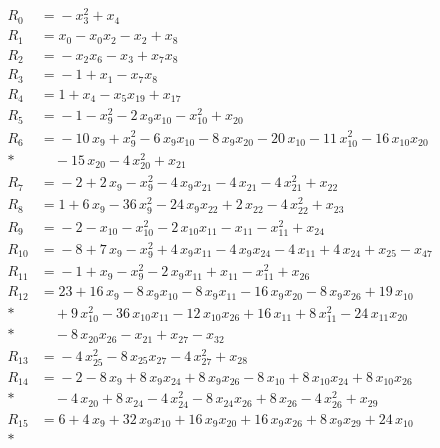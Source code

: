 \begingroup
\small
\setlength{\jot}{0pt}
\begin{align*}
R_{0} &={} -x_{3}^{2} +x_{4} \\[2pt]
R_{1} &={} x_{0} -x_{0} x_{2} -x_{2} +x_{8} \\[2pt]
R_{2} &={} -x_{2} x_{6} -x_{3} +x_{7} x_{8} \\[2pt]
R_{3} &={} -1 +x_{1} -x_{7} x_{8} \\[2pt]
R_{4} &={} 1 +x_{4} -x_{5} x_{19} +x_{17} \\[2pt]
R_{5} &={} -1 -x_{9}^{2} -2\,x_{9} x_{10} -x_{10}^{2} +x_{20} \\[2pt]
R_{6} &={} -10\,x_{9} +x_{9}^{2} -6\,x_{9} x_{10} -8\,x_{9} x_{20} -20\,x_{10} -11\,x_{10}^{2} -16\,x_{10} x_{20} \\*
&\quad{} -15\,x_{20} -4\,x_{20}^{2} +x_{21} \\[2pt]
R_{7} &={} -2 +2\,x_{9} -x_{9}^{2} -4\,x_{9} x_{21} -4\,x_{21} -4\,x_{21}^{2} +x_{22} \\[2pt]
R_{8} &={} 1 +6\,x_{9} -36\,x_{9}^{2} -24\,x_{9} x_{22} +2\,x_{22} -4\,x_{22}^{2} +x_{23} \\[2pt]
R_{9} &={} -2 -x_{10} -x_{10}^{2} -2\,x_{10} x_{11} -x_{11} -x_{11}^{2} +x_{24} \\[2pt]
R_{10} &={} -8 +7\,x_{9} -x_{9}^{2} +4\,x_{9} x_{11} -4\,x_{9} x_{24} -4\,x_{11} +4\,x_{24} +x_{25} -x_{47} \\[2pt]
R_{11} &={} -1 +x_{9} -x_{9}^{2} -2\,x_{9} x_{11} +x_{11} -x_{11}^{2} +x_{26} \\[2pt]
R_{12} &={} 23 +16\,x_{9} -8\,x_{9} x_{10} -8\,x_{9} x_{11} -16\,x_{9} x_{20} -8\,x_{9} x_{26} +19\,x_{10} \\*
&\quad{} +9\,x_{10}^{2} -36\,x_{10} x_{11} -12\,x_{10} x_{26} +16\,x_{11} +8\,x_{11}^{2} -24\,x_{11} x_{20} \\*
&\quad{} -8\,x_{20} x_{26} -x_{21} +x_{27} -x_{32} \\[2pt]
R_{13} &={} -4\,x_{25}^{2} -8\,x_{25} x_{27} -4\,x_{27}^{2} +x_{28} \\[2pt]
R_{14} &={} -2 -8\,x_{9} +8\,x_{9} x_{24} +8\,x_{9} x_{26} -8\,x_{10} +8\,x_{10} x_{24} +8\,x_{10} x_{26} \\*
&\quad{} -4\,x_{20} +8\,x_{24} -4\,x_{24}^{2} -8\,x_{24} x_{26} +8\,x_{26} -4\,x_{26}^{2} +x_{29} \\[2pt]
R_{15} &={} 6 +4\,x_{9} +32\,x_{9} x_{10} +16\,x_{9} x_{20} +16\,x_{9} x_{26} +8\,x_{9} x_{29} +24\,x_{10} \\*

\end{align*}
